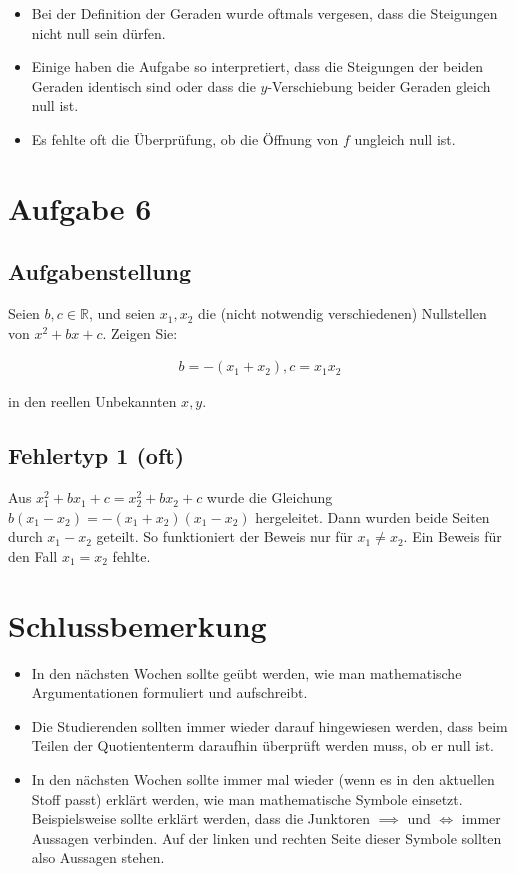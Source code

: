 \documentclass[a4paper]{article}
\newcommand*{\R}{\mathbb R}
\begin{document}
\begin{itemize}
  \item Bei der Definition der Geraden wurde oftmals vergesen, dass die Steigungen nicht null sein dürfen.
  \item Einige haben die Aufgabe so interpretiert, dass die Steigungen der beiden Geraden identisch sind oder dass die $y$-Verschiebung beider Geraden gleich null ist.
  \item Es fehlte oft die Überprüfung, ob die Öffnung von $f$ ungleich null ist.
\end{itemize}

\section{Aufgabe 6}

\subsection{Aufgabenstellung}

Seien $b,c\in\R$, und seien $x_1,x_2$ die (nicht notwendig verschiedenen) Nullstellen von $x^2+bx+c$. Zeigen Sie:

\begin{align}
  b=-(x_1+x_2), c=x_1x_2
\end{align}

in den reellen Unbekannten $x,y$.

\subsection{Fehlertyp 1 (oft)}

Aus $x_1^2+bx_1+c=x_2^2+bx_2+c$ wurde die Gleichung $b(x_1-x_2)=-(x_1+x_2)(x_1-x_2)$ hergeleitet. Dann wurden beide Seiten durch $x_1-x_2$ geteilt. So funktioniert der Beweis nur für $x_1\neq x_2$. Ein Beweis für den Fall $x_1=x_2$ fehlte.

\section{Schlussbemerkung}

\begin{itemize}
  \item In den nächsten Wochen sollte geübt werden, wie man mathematische Argumentationen formuliert und aufschreibt.
  \item Die Studierenden sollten immer wieder darauf hingewiesen werden, dass beim Teilen der Quotiententerm daraufhin überprüft werden muss, ob er null ist.
  \item In den nächsten Wochen sollte immer mal wieder (wenn es in den aktuellen Stoff passt) erklärt werden, wie man mathematische Symbole einsetzt. Beispielsweise sollte erklärt werden, dass die Junktoren $\implies$ und $\iff$ immer Aussagen verbinden. Auf der linken und rechten Seite dieser Symbole sollten also Aussagen stehen.
\end{itemize}
\end{document}
